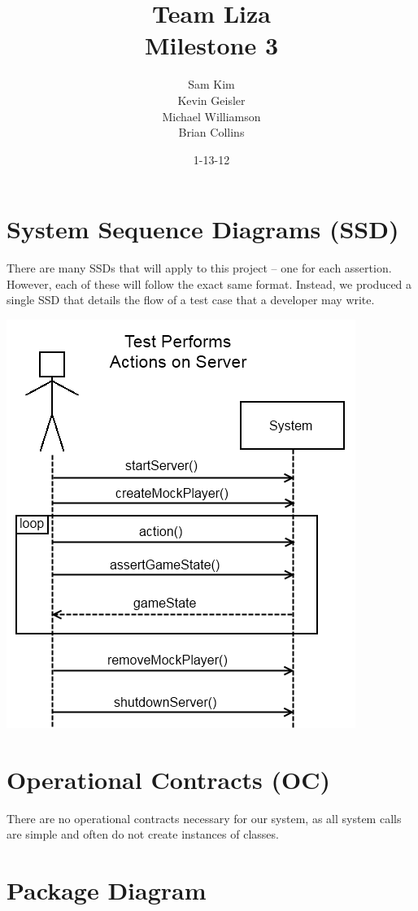 \documentclass{article}
\title{Team Liza \\ Milestone 3}
\author{Sam Kim \\ Kevin Geisler \\ Michael Williamson \\ Brian Collins}
\date{1-13-12}
\begin{document}
\maketitle
\newpage

\tableofcontents

\newpage

\section{System Sequence Diagrams (SSD)}

There are many SSDs that will apply to this project -- one for each assertion. 
However, each of these will follow the exact same format. Instead, we
produced a single SSD that details the flow of a test case that a developer may
write.

\includegraphics{ssd}

\section{Operational Contracts (OC)}

There are no operational contracts necessary for our system, as all system
calls are simple and often do not create instances of classes.

\section{Package Diagram}
\end{document}

